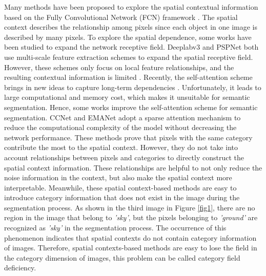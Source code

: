 \documentclass[10pt,journal,cspaper,compsoc]{IEEEtran}
\begin{document}
Many methods have been proposed to explore the spatial contextual information based on the Fully Convolutional Network (FCN) framework \cite{shen2020ranet, xiao2018unified, zhang2020feature, seyedhosseini2015semantic}. The spatial context describes the relationship among pixels since each object in one image is described by many pixels. To explore the spatial dependence, some works \cite{ding2020semantic} have been studied to expand the network receptive field. Deeplabv3 \cite{chen2017rethinking} and PSPNet \cite{zhao2017pyramid} both use multi-scale feature extraction schemes to expand the spatial receptive field. However, these schemes only focus on local feature relationships, and the resulting contextual information is limited \cite{chen2014semantic}. Recently, the self-attention scheme brings in new ideas to capture long-term dependencies \cite{wang2018non}. Unfortunately, it leads to large computational and memory cost, which makes it unsuitable for semantic segmentation. Hence, some works improve the self-attention scheme for semantic segmentation. CCNet \cite{huang2019ccnet} and EMANet \cite{li2019expectation} adopt a sparse attention mechanism to reduce the computational complexity of the model without decreasing the network performance. These methods prove that pixels with the same category contribute the most to the spatial context. However, they do not take into account relationships between pixels and categories to directly construct the spatial context information. These relationships are helpful to not only reduce the noise information in the context, but also make the spatial context more interpretable. Meanwhile, these spatial context-based methods are easy to introduce category information that does not exist in the image during the segmentation process. As shown in the third image in Figure \ref{fig1}, there are no region in the image that belong to \textit{'sky'}, but the pixels belonging to \textit{'ground'} are recognized as \textit{'sky'} in the segmentation process. The occurrence of this phenomenon indicates that spatial contexts do not contain category information of images. Therefore, spatial contexts-based methods are easy to lose the field in the category dimension of images, this problem can be called category field deficiency.
\end{document}
